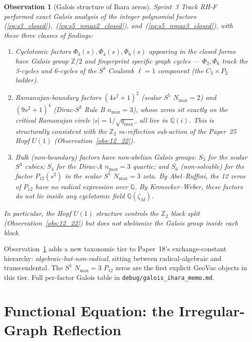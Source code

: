 \documentclass[11pt]{article}
\newtheorem{observation}{Observation}
\begin{document}
\begin{observation}[Galois structure of Ihara zeros]
\label{obs:galois}
Sprint~3 Track RH-F performed exact Galois analysis of the integer
polynomial factors (\ref{eq:s3_closed}),~(\ref{eq:s5_nmax2_closed}),
and~(\ref{eq:s5_nmax3_closed}), with these three classes of findings:
\begin{enumerate}
\item Cyclotomic factors $\Phi_3(s), \Phi_4(s), \Phi_6(s)$ appearing
  in the closed forms have Galois group $\mathbb{Z}/2$ and fingerprint
  specific graph cycles --- $\Phi_3, \Phi_6$ track the 3-cycles and
  6-cycles of the $S^3$ Coulomb $\ell=1$ component (the
  $C_3 \times P_2$ ladder).
\item Ramanujan-boundary factors $(4s^2+1)^2$ (scalar $S^5$
  $N_{\max}=2$) and $(9s^2+1)^4$ (Dirac-$S^3$ Rule B $n_{\max}=3$),
  whose zeros sit exactly on the critical Ramanujan circle
  $|s| = 1/\sqrt{q_{\max}}$, all live in $\mathbb{Q}(i)$. This is
  structurally consistent with the $\mathbb{Z}_2$
  $m$-reflection sub-action of the Paper~25 Hopf $U(1)$
  (Observation~\ref{obs:12_22}).
\item Bulk (non-boundary) factors have non-abelian Galois groups:
  $S_3$ for the scalar $S^3$ cubics; $S_4$ for the Dirac-A
  $n_{\max}=3$ quartic; and $S_6$ (non-solvable) for the factor
  $P_{12}(s^2)$ in the scalar $S^5$ $N_{\max}=3$ zeta. By
  Abel--Ruffini, the 12 zeros of $P_{12}$ have no radical
  expression over $\mathbb{Q}$. By Kronecker--Weber, these factors
  do not lie inside any cyclotomic field $\mathbb{Q}(\zeta_M)$.
\end{enumerate}
In particular, the Hopf $U(1)$ structure controls the $\mathbb{Z}_2$
\emph{block split} (Observation~\ref{obs:12_22}) but does not
abelianize the Galois group inside each block.
\end{observation}

Observation~\ref{obs:galois} adds a new taxonomic tier to Paper~18's
exchange-constant hierarchy: \emph{algebraic-but-non-radical}, sitting
between radical-algebraic and transcendental. The $S^5$ $N_{\max}=3$
$P_{12}$ zeros are the first explicit GeoVac objects in this tier.
Full per-factor Galois table in \texttt{debug/galois\_ihara\_memo.md}.

\section{Functional Equation: the Irregular-Graph Reflection}
\label{sec:functional_equation}
\end{document}
